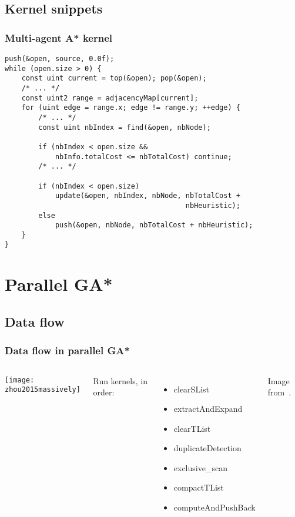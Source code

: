 \documentclass{beamer}
\begin{document}
\subsection{Kernel snippets}
\begin{frame}[fragile]
    \frametitle{Multi-agent A* kernel}
    \begin{lstlisting}
push(&open, source, 0.0f);
while (open.size > 0) {
    const uint current = top(&open); pop(&open);
    /* ... */
    const uint2 range = adjacencyMap[current];
    for (uint edge = range.x; edge != range.y; ++edge) {
        /* ... */
        const uint nbIndex = find(&open, nbNode);

        if (nbIndex < open.size &&
            nbInfo.totalCost <= nbTotalCost) continue;
        /* ... */

        if (nbIndex < open.size)
            update(&open, nbIndex, nbNode, nbTotalCost +
                                           nbHeuristic);
        else
            push(&open, nbNode, nbTotalCost + nbHeuristic);
    }
}
    \end{lstlisting}
\end{frame}

\section{Parallel GA*}
\subsection{Data flow}
\begin{frame}
    \frametitle{Data flow in parallel GA*}
    \begin{columns}
        \texttt{[image: zhou2015massively]}
        
        Run kernels, in order:
        \begin{itemize}
            \item clearSList
            \item extractAndExpand
            \item clearTList
            \item duplicateDetection
            \item exclusive\_scan
            \item compactTList
            \item computeAndPushBack
        \end{itemize}
        
        \vspace{1em}
        Image from~\cite{zhou2015massively}.
    \end{columns}
\end{frame}
\end{document}
